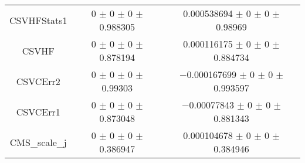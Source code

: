 \begin{table}
\begin{tabular}{ccc}
CSVHFStats1 	& \num{0} $\pm$ \num{0} $\pm$ \num{0} $\pm$ \num{0.988305} 	& \num{0.000538694} $\pm$ \num{0} $\pm$ \num{0} $\pm$ \num{0.98969}\\
CSVHF 	& \num{0} $\pm$ \num{0} $\pm$ \num{0} $\pm$ \num{0.878194} 	& \num{0.000116175} $\pm$ \num{0} $\pm$ \num{0} $\pm$ \num{0.884734}\\
CSVCErr2 	& \num{0} $\pm$ \num{0} $\pm$ \num{0} $\pm$ \num{0.99303} 	& \num{-0.000167699} $\pm$ \num{0} $\pm$ \num{0} $\pm$ \num{0.993597}\\
CSVCErr1 	& \num{0} $\pm$ \num{0} $\pm$ \num{0} $\pm$ \num{0.873048} 	& \num{-0.00077843} $\pm$ \num{0} $\pm$ \num{0} $\pm$ \num{0.881343}\\
CMS\_scale\_j 	& \num{0} $\pm$ \num{0} $\pm$ \num{0} $\pm$ \num{0.386947} 	& \num{0.000104678} $\pm$ \num{0} $\pm$ \num{0} $\pm$ \num{0.384946}\\
\bottomrule
\end{tabular}
\end{table}